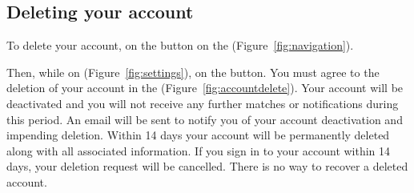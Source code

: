 
\subsection{Deleting your account}
\label{sec:account-delete}

To delete your account,  on the  button on the  (Figure~\ref{fig:navigation}).

Then, while on  (Figure~\ref{fig:settings}),  on the  button.  You must agree to the deletion of your account in the  (Figure~\ref{fig:accountdelete}). Your account will be deactivated and you will not receive any further matches or notifications during this period.  An email will be sent to notify you of your account deactivation and impending deletion.  Within 14 days your account will be permanently deleted along with all associated information.  If you sign in to your account within 14 days, your deletion request will be cancelled.  There is no way to recover a deleted account.